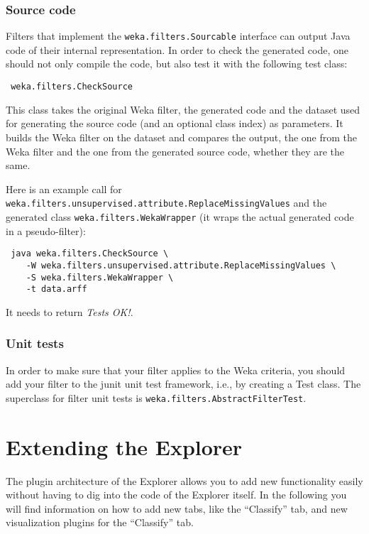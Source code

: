 \subsubsection{Source code}
Filters that implement the \texttt{weka.filters.Sourcable} interface can output
Java code of their internal representation. In order to check the generated
code, one should not only compile the code, but also test it with the following
test class:
\begin{verbatim}
 weka.filters.CheckSource
\end{verbatim}
This class takes the original Weka filter, the generated code and the dataset
used for generating the source code (and an optional class index) as parameters.
It builds the Weka filter on the dataset and compares the output, the one from
the Weka filter and the one from the generated source code, whether they are the
same.

Here is an example call for
\texttt{weka.filters.unsupervised.attribute.ReplaceMissingValues} and the
generated class \texttt{weka.filters.WekaWrapper} (it wraps the actual generated
code in a pseudo-filter):
\begin{verbatim}
 java weka.filters.CheckSource \
    -W weka.filters.unsupervised.attribute.ReplaceMissingValues \
    -S weka.filters.WekaWrapper \
    -t data.arff
\end{verbatim}
It needs to return \textit{Tests OK!}.

\subsubsection{Unit tests}
In order to make sure that your filter applies to the Weka criteria, you
should add your filter to the junit unit test framework, i.e., by creating a
Test class. The superclass for filter unit tests is
\texttt{weka.filters.AbstractFilterTest}.


\newpage
\section{Extending the Explorer}
The plugin architecture of the Explorer allows you to add new functionality
easily without having to dig into the code of the Explorer itself. In the
following you will find information on how to add new tabs, like the
``Classify'' tab, and new visualization plugins for the ``Classify'' tab.

